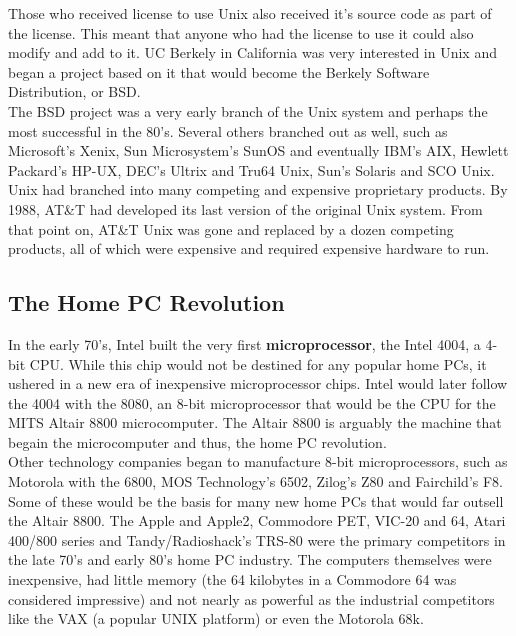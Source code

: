 Those who received license to use Unix also received it's source code as part of the license.  This meant that anyone who had the license to use it could also modify and add to it.  UC Berkely in California was very interested in Unix and began a project based on it that would become the Berkely Software Distribution, or BSD.\\

The BSD project was a very early branch of the Unix system and perhaps the most successful in the 80's.  Several others branched out as well, such as Microsoft's Xenix, Sun Microsystem's SunOS and eventually IBM's AIX, Hewlett Packard's HP-UX, DEC's Ultrix and Tru64 Unix, Sun's Solaris and SCO Unix.\\

Unix had branched into many competing and expensive proprietary products.  By 1988, AT\&T had developed its last version of the original Unix system.  From that point on, AT\&T Unix was gone and replaced by a dozen competing products, all of which were expensive and required expensive hardware to run.\\

\subsection{The Home PC Revolution}

In the early 70's, Intel built the very first \textbf{microprocessor}, the Intel 4004, a 4-bit CPU.  While this chip would not be destined for any popular home PCs, it ushered in a new era of inexpensive microprocessor chips.  Intel would later follow the 4004 with the 8080, an 8-bit microprocessor that would be the CPU for the MITS Altair 8800 microcomputer.  The Altair 8800 is arguably the machine that begain the microcomputer and thus, the home PC revolution.\\

Other technology companies began to manufacture 8-bit microprocessors, such as Motorola with the 6800, MOS Technology's 6502, Zilog's Z80 and Fairchild's F8.  Some of these would be the basis for many new home PCs that would far outsell the Altair 8800.  The Apple and Apple2, Commodore PET, VIC-20 and 64, Atari 400/800 series and Tandy/Radioshack's TRS-80 were the primary competitors in the late 70's and early 80's home PC industry.  The computers themselves were inexpensive, had little memory (the 64 kilobytes in a Commodore 64 was considered impressive) and not nearly as powerful as the industrial competitors like the VAX (a popular UNIX platform) or even the Motorola 68k.\\

